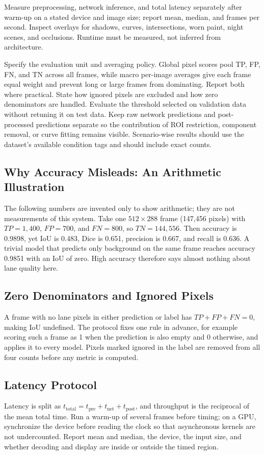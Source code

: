 \documentclass[10pt,a4paper,twocolumn]{article}
\begin{document}
Measure preprocessing, network inference, and total latency separately after warm-up on a stated device and image size; report mean, median, and frames per second. Inspect overlays for shadows, curves, intersections, worn paint, night scenes, and occlusions. Runtime must be measured, not inferred from architecture.

Specify the evaluation unit and averaging policy. Global pixel scores pool TP, FP, FN, and TN across all frames, while macro per-image averages give each frame equal weight and prevent long or large frames from dominating. Report both where practical. State how ignored pixels are excluded and how zero denominators are handled. Evaluate the threshold selected on validation data without retuning it on test data. Keep raw network predictions and post-processed predictions separate so the contribution of ROI restriction, component removal, or curve fitting remains visible. Scenario-wise results should use the dataset's available condition tags and should include exact counts.

\subsection{Why Accuracy Misleads: An Arithmetic Illustration}
The following numbers are invented only to show arithmetic; they are not measurements of this system. Take one $512\times288$ frame (147,456 pixels) with $TP=1{,}400$, $FP=700$, and $FN=800$, so $TN=144{,}556$. Then accuracy is 0.9898, yet IoU is 0.483, Dice is 0.651, precision is 0.667, and recall is 0.636. A trivial model that predicts only background on the same frame reaches accuracy 0.9851 with an IoU of zero. High accuracy therefore says almost nothing about lane quality here.

\subsection{Zero Denominators and Ignored Pixels}
A frame with no lane pixels in either prediction or label has $TP+FP+FN=0$, making IoU undefined. The protocol fixes one rule in advance, for example scoring such a frame as 1 when the prediction is also empty and 0 otherwise, and applies it to every model. Pixels marked ignored in the label are removed from all four counts before any metric is computed.

\subsection{Latency Protocol}
Latency is split as $t_{\mathrm{total}}=t_{\mathrm{pre}}+t_{\mathrm{net}}+t_{\mathrm{post}}$, and throughput is the reciprocal of the mean total time. Run a warm-up of several frames before timing; on a GPU, synchronize the device before reading the clock so that asynchronous kernels are not undercounted. Report mean and median, the device, the input size, and whether decoding and display are inside or outside the timed region.
\end{document}
